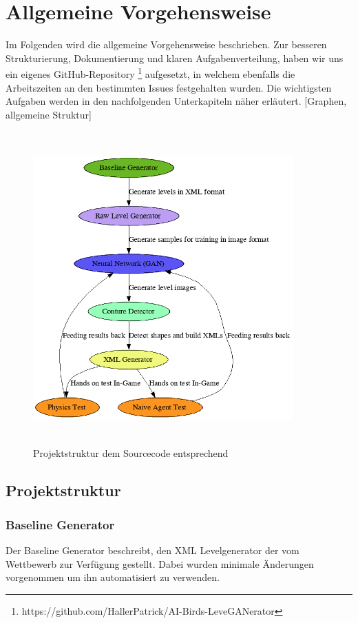 \section{Allgemeine Vorgehensweise}
Im Folgenden wird die allgemeine Vorgehensweise beschrieben. Zur besseren Strukturierung, Dokumentierung und klaren Aufgabenverteilung, haben wir uns ein eigenes GitHub-Repository \footnote{https://github.com/HallerPatrick/AI-Birds-LeveGANerator} aufgesetzt, in welchem ebenfalls die Arbeitszeiten an den bestimmten Issues festgehalten wurden. Die wichtigsten Aufgaben werden in den nachfolgenden Unterkapiteln näher erläutert. [Graphen, allgemeine Struktur]
\begin{figure}
    \centering
	\includegraphics[height=12cm, width=10cm]{img/project_structure.png}
	\caption{Projektstruktur dem Sourcecode entsprechend}
\end{figure}



\subsection{Projektstruktur}

\subsubsection{Baseline Generator}

Der Baseline Generator beschreibt, den XML Levelgenerator der vom Wettbewerb zur Verfügung gestellt. Dabei wurden minimale Änderungen vorgenommen um ihn automatisiert zu verwenden.

